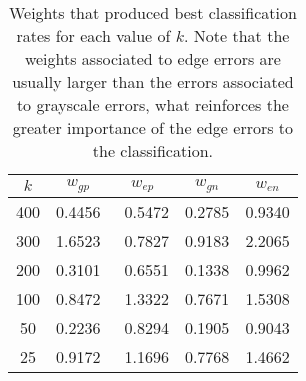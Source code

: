 \documentclass[10pt, conference, compsocconf]{IEEEtran}
\begin{document}

\begin{table}
  \caption{Weights that produced best classification rates for each value of $k$. Note that the weights associated to edge errors are usually larger than the errors associated to grayscale errors, what reinforces the greater importance of the edge errors to the classification.}
  \begin{center}
    \begin{tabular}{  c | c  c  c  c  }
      \hline
      $k$ & $w_{gp}$ & $w_{ep}$ & $w_{gn}$ & $w_{en}$ \\
      \hline
      400 & 0.4456 & 0.5472 & 0.2785 & 0.9340 \\
      300 & 1.6523 & 0.7827 & 0.9183 & 2.2065 \\
      200 & 0.3101 & 0.6551 & 0.1338 & 0.9962 \\
      100 & 0.8472 & 1.3322 & 0.7671 & 1.5308 \\
      50  & 0.2236 & 0.8294 & 0.1905 & 0.9043 \\
      25  & 0.9172 & 1.1696 & 0.7768 & 1.4662 \\
      \hline  
    \end{tabular}
  \end{center}
  \label{table-weights}
\end{table}




%
%
\end{document}
